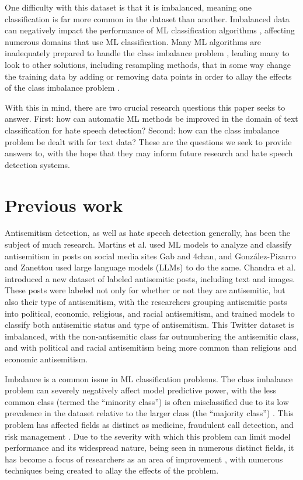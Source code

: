 \documentclass[runningheads]{llncs}
\begin{document}
One difficulty with this dataset is that it is imbalanced, meaning one classification is far more common in the dataset than another. Imbalanced data can negatively impact the performance of ML classification algorithms \cite{sun}, affecting numerous domains that use ML classification. Many ML algorithms are inadequately prepared to handle the class imbalance problem \cite{sun}, leading many to look to other solutions, including resampling methods, that in some way change the training data by adding or removing data points in order to allay the effects of the class imbalance problem \cite{japkowicz}.

With this in mind, there are two crucial research questions this paper seeks to answer. First: how can automatic ML methods be improved in the domain of text classification for hate speech detection? Second: how can the class imbalance problem be dealt with for text data? These are the questions we seek to provide answers to, with the hope that they may inform future research and hate speech detection systems.

\section{Previous work}
Antisemitism detection, as well as hate speech detection generally, has been the subject of much research. Martins et al. \cite{martins} used ML models to analyze and classify antisemitism in posts on social media sites Gab and 4chan, and González-Pizarro and Zanettou \cite{gonzalez} used large language models (LLMs) to do the same. Chandra et al. \cite{chandra} introduced a new dataset of labeled antisemitic posts, including text and images. These posts were labeled not only for whether or not they are antisemitic, but also their type of antisemitism, with the researchers grouping antisemitic posts into political, economic, religious, and racial antisemitism, and trained models to classify both antisemitic status and type of antisemitism. This Twitter dataset is imbalanced, with the non-antisemitic class far outnumbering the antisemitic class, and with political and racial antisemitism being more common than religious and economic antisemitism.

Imbalance is a common issue in ML classification problems. The class imbalance problem can severely negatively affect model predictive power, with the less common class (termed the ``minority class'') is often misclassified due to its low prevalence in the dataset relative to the larger class (the ``majority class'') \cite{abdelrahman}. This problem has affected fields as distinct as medicine, fraudulent call detection, and risk management \cite{sun}. Due to the severity with which this problem can limit model performance and its widespread nature, being seen in numerous distinct fields, it has become a focus of researchers as an area of improvement \cite{abdelrahman}, with numerous techniques being created to allay the effects of the problem.
\end{document}
